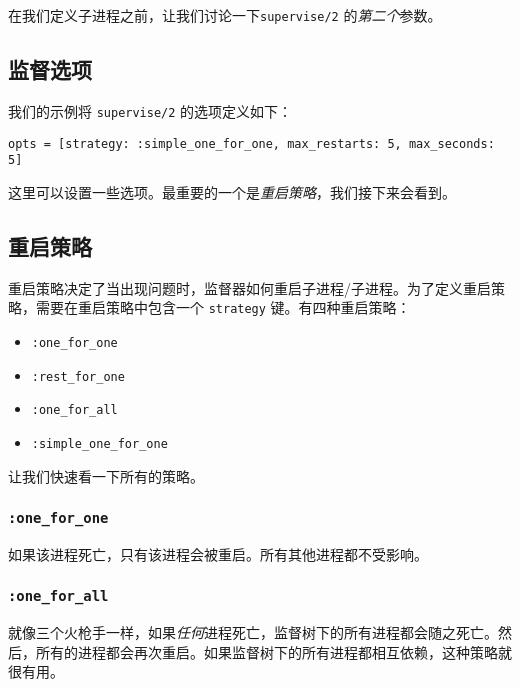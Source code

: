 在我们定义子进程之前，让我们讨论一下\texttt{supervise/2} 的\emph{第二个}参数。

 \subsection{ 监督选项}

我们的示例将 \texttt{supervise/2} 的选项定义如下：

\begin{code}{}
\begin{verbatim}
opts = [strategy: :simple_one_for_one, max_restarts: 5, max_seconds: 5]
\end{verbatim}
\end{code}

这里可以设置一些选项。最重要的一个是\emph{重启策略}，我们接下来会看到。

 \subsection{ 重启策略}

重启策略决定了当出现问题时，监督器如何重启子进程/子进程。为了定义重启策略，需要在重启策略中包含一个
\texttt{strategy} 键。有四种重启策略：

\begin{itemize}

\item
  \texttt{:one\_for\_one}
\item
  \texttt{:rest\_for\_one}
\item
  \texttt{:one\_for\_all}
\item
  \texttt{:simple\_one\_for\_one}
\end{itemize}

让我们快速看一下所有的策略。


\subsubsection{\texorpdfstring{\texttt{:one\_for\_one}}{:one\_for\_one}}

如果该进程死亡，只有该进程会被重启。所有其他进程都不受影响。


\subsubsection{\texorpdfstring{\texttt{:one\_for\_all}}{:one\_for\_all}}

就像三个火枪手一样，如果\emph{任何}进程死亡，监督树下的所有进程都会随之死亡。然后，所有的进程都会再次重启。如果监督树下的所有进程都相互依赖，这种策略就很有用。


